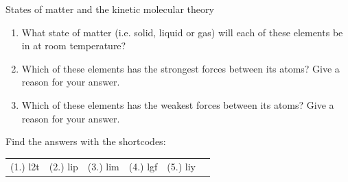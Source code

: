 \begin{eocexercises}{States of matter and the kinetic molecular theory}
\begin{enumerate}[noitemsep, label=\textbf{\arabic*}. ]
    \par
  \label{m38730*id312057}\begin{enumerate}[noitemsep, label=\textbf{\alph*}. ] 
            \label{m38730*uid109}\item What state of matter (i.e. solid, liquid or gas) will each of 
these elements be in at room temperature?
\label{m38730*uid110}\item Which of these elements has the strongest forces 
between its atoms? Give a reason for your answer.
\label{m38730*uid111}\item Which of these elements has the weakest forces between 
its atoms? Give a reason for your answer.
\end{enumerate}
                \end{enumerate}
\label{m38730**end}
  \label{3fc6acf7f608d0b0e2d136d6a7710402**end}
\par {} Find the answers with the shortcodes:
 \par \begin{tabular}[h]{cccccc}
 (1.) l2t  &  (2.) lip  &  (3.) lim  &  (4.) lgf  &  (5.) liy  & \end{tabular}
\end{eocexercises}